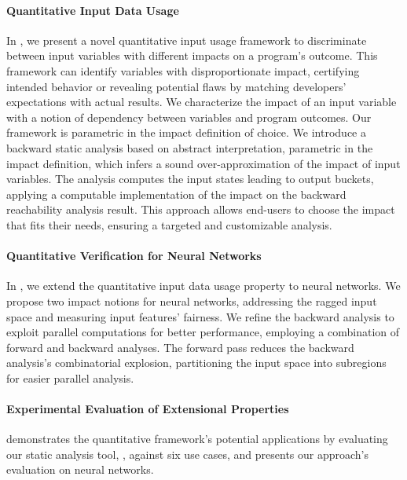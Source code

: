 \paragraph{Quantitative Input Data Usage}
In , we present a novel quantitative input usage framework to discriminate between input variables with different impacts on a program's outcome.
This framework can identify variables with disproportionate impact, certifying intended behavior or revealing potential flaws by matching developers' expectations with actual results.
We characterize the impact of an input variable with a notion of dependency between variables and program outcomes.
Our framework is parametric in the impact definition of choice.
%
We introduce a backward static analysis based on abstract interpretation, parametric in the impact definition, which infers a sound over-approximation of the impact of input variables.
The analysis computes the input states leading to output buckets, applying a computable implementation of the impact on the backward reachability analysis result.
This approach allows end-users to choose the impact that fits their needs, ensuring a targeted and customizable analysis.


\paragraph{Quantitative Verification for Neural Networks}
In , we extend the quantitative input data usage property to neural networks.
We propose two impact notions for neural networks, addressing the ragged input space and measuring input features' fairness.
We refine the backward analysis to exploit parallel computations for better performance, employing a combination of forward and backward analyses.
The forward pass reduces the backward analysis's combinatorial explosion, partitioning the input space into subregions for easier parallel analysis.


\paragraph{Experimental Evaluation of Extensional Properties}
 demonstrates the quantitative framework's potential applications by evaluating our static analysis tool, \impatto, against six use cases, and presents our approach's evaluation on neural networks.

